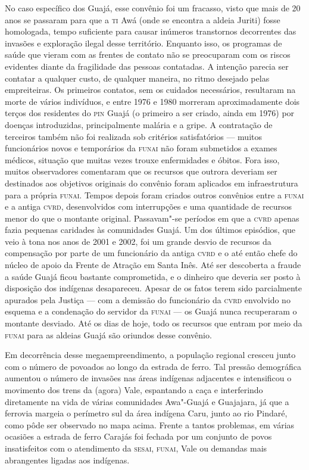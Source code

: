No caso específico dos Guajá, esse convênio foi um fracasso, visto que
mais de 20 anos se passaram para que a \textsc{ti} Awá (onde se encontra a aldeia
Juriti) fosse homologada, tempo suficiente para causar inúmeros
transtornos decorrentes das invasões e exploração ilegal desse
território. Enquanto isso, os programas de saúde que vieram com as
frentes de contato não se preocuparam com os riscos evidentes diante da
fragilidade das pessoas contatadas. A intenção parecia ser contatar a
qualquer custo, de qualquer maneira, no ritmo desejado pelas
empreiteiras. Os primeiros contatos, sem os cuidados necessários,
resultaram na morte de vários indivíduos, e entre 1976 e 1980 morreram
aproximadamente dois terços dos residentes do \textsc{pin} Guajá (o primeiro a
ser criado, ainda em 1976) por doenças introduzidas, principalmente
malária e a gripe. A contratação de terceiros também não foi realizada
sob critérios satisfatórios --- muitos funcionários novos e temporários da
\textsc{funai} não foram submetidos a exames médicos, situação que muitas vezes
trouxe enfermidades e óbitos. Fora isso, muitos observadores comentaram
que os recursos que outrora deveriam ser destinados aos objetivos
originais do convênio foram aplicados em infraestrutura para a própria
\textsc{funai}. Tempos depois foram criados outros convênios entre a \textsc{funai} e a
antiga \textsc{cvrd}, desenvolvidos com interrupções e uma quantidade de recursos
menor do que o montante original. Passavam"-se períodos em que a \textsc{cvrd}
apenas fazia pequenas caridades às comunidades Guajá. Um dos últimos
episódios, que veio à tona nos anos de 2001 e 2002, foi um grande desvio
de recursos da compensação por parte de um funcionário da antiga \textsc{cvrd} e
o até então chefe do núcleo de apoio da Frente de Atração em Santa Inês.
Até ser descoberta a fraude a saúde Guajá ficou bastante comprometida, e
o dinheiro que deveria ser posto à disposição dos indígenas desapareceu.
Apesar de os fatos terem sido parcialmente apurados pela Justiça --- com a
demissão do funcionário da \textsc{cvrd} envolvido no esquema e a condenação do
servidor da \textsc{funai} --- os Guajá nunca recuperaram o montante desviado. Até
os dias de hoje, todo os recursos que entram por meio da \textsc{funai} para as
aldeias Guajá são oriundos desse convênio.

Em decorrência desse megaempreendimento, a população regional cresceu
junto com o número de povoados ao longo da estrada de ferro. Tal pressão
demográfica aumentou o número de invasões nas áreas indígenas adjacentes
e intensificou o movimento dos trens da (agora) Vale, espantando a caça
e interferindo diretamente na vida de várias comunidades Awa"-Guajá e
Guajajara, já que a ferrovia margeia o perímetro sul da área indígena
Caru, junto ao rio Pindaré, como pôde ser observado no mapa acima.
Frente a tantos problemas, em várias ocasiões a estrada de ferro Carajás
foi fechada por um conjunto de povos insatisfeitos com o atendimento da
\textsc{sesai}, \textsc{funai}, Vale ou demandas mais abrangentes ligadas aos indígenas.

